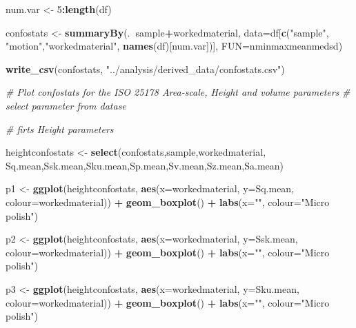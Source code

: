 \documentclass[
]{article}
\newenvironment{Shaded}{\begin{snugshade}}{\end{snugshade}}
\newcommand{\CommentTok}[1]{\textcolor[rgb]{0.56,0.35,0.01}{\textit{#1}}}
\newcommand{\DataTypeTok}[1]{\textcolor[rgb]{0.13,0.29,0.53}{#1}}
\newcommand{\DecValTok}[1]{\textcolor[rgb]{0.00,0.00,0.81}{#1}}
\newcommand{\KeywordTok}[1]{\textcolor[rgb]{0.13,0.29,0.53}{\textbf{#1}}}
\newcommand{\NormalTok}[1]{#1}
\newcommand{\OperatorTok}[1]{\textcolor[rgb]{0.81,0.36,0.00}{\textbf{#1}}}
\newcommand{\StringTok}[1]{\textcolor[rgb]{0.31,0.60,0.02}{#1}}
\begin{document}
\begin{Shaded}
\begin{Highlighting}[]
\NormalTok{num.var <-}\StringTok{ }\DecValTok{5}\OperatorTok{:}\KeywordTok{length}\NormalTok{(df)}

\NormalTok{confostats <-}\StringTok{ }\KeywordTok{summaryBy}\NormalTok{(.}\OperatorTok{~}\NormalTok{sample}\OperatorTok{+}\NormalTok{workedmaterial, }\DataTypeTok{data=}\NormalTok{df[}\KeywordTok{c}\NormalTok{(}\StringTok{"sample"}\NormalTok{, }\StringTok{"motion"}\NormalTok{,}\StringTok{"workedmaterial"}\NormalTok{, }\KeywordTok{names}\NormalTok{(df)[num.var])], }\DataTypeTok{FUN=}\NormalTok{nminmaxmeanmedsd)}

\KeywordTok{write_csv}\NormalTok{(confostats, }\StringTok{"../analysis/derived_data/confostats.csv"}\NormalTok{)}

\CommentTok{# Plot confostats for the ISO 25178 Area-scale, Height and volume parameters}
\CommentTok{# select parameter from datase}

\CommentTok{# firts Height parameters}

\NormalTok{heightconfostats <-}\StringTok{ }\KeywordTok{select}\NormalTok{(confostats,sample,workedmaterial, Sq.mean,Ssk.mean,Sku.mean,Sp.mean,Sv.mean,Sz.mean,Sa.mean)}

\NormalTok{p1 <-}\StringTok{ }\KeywordTok{ggplot}\NormalTok{(heightconfostats, }\KeywordTok{aes}\NormalTok{(}\DataTypeTok{x=}\NormalTok{workedmaterial, }\DataTypeTok{y=}\NormalTok{Sq.mean, }\DataTypeTok{colour=}\NormalTok{workedmaterial)) }\OperatorTok{+}\StringTok{ }
\StringTok{  }\KeywordTok{geom_boxplot}\NormalTok{() }\OperatorTok{+}
\StringTok{  }\KeywordTok{labs}\NormalTok{(}\DataTypeTok{x=}\StringTok{""}\NormalTok{, }\DataTypeTok{colour=}\StringTok{"Micro polish"}\NormalTok{)}

\NormalTok{p2 <-}\StringTok{ }\KeywordTok{ggplot}\NormalTok{(heightconfostats, }\KeywordTok{aes}\NormalTok{(}\DataTypeTok{x=}\NormalTok{workedmaterial, }\DataTypeTok{y=}\NormalTok{Ssk.mean, }\DataTypeTok{colour=}\NormalTok{workedmaterial)) }\OperatorTok{+}\StringTok{   }
\StringTok{  }\KeywordTok{geom_boxplot}\NormalTok{() }\OperatorTok{+}
\StringTok{  }\KeywordTok{labs}\NormalTok{(}\DataTypeTok{x=}\StringTok{""}\NormalTok{, }\DataTypeTok{colour=}\StringTok{"Micro polish"}\NormalTok{)}

\NormalTok{p3 <-}\StringTok{ }\KeywordTok{ggplot}\NormalTok{(heightconfostats, }\KeywordTok{aes}\NormalTok{(}\DataTypeTok{x=}\NormalTok{workedmaterial, }\DataTypeTok{y=}\NormalTok{Sku.mean, }\DataTypeTok{colour=}\NormalTok{workedmaterial)) }\OperatorTok{+}\StringTok{   }
\StringTok{  }\KeywordTok{geom_boxplot}\NormalTok{() }\OperatorTok{+}
\StringTok{  }\KeywordTok{labs}\NormalTok{(}\DataTypeTok{x=}\StringTok{""}\NormalTok{, }\DataTypeTok{colour=}\StringTok{"Micro polish"}\NormalTok{)}


\end{Highlighting}
\end{Shaded}
\end{document}
